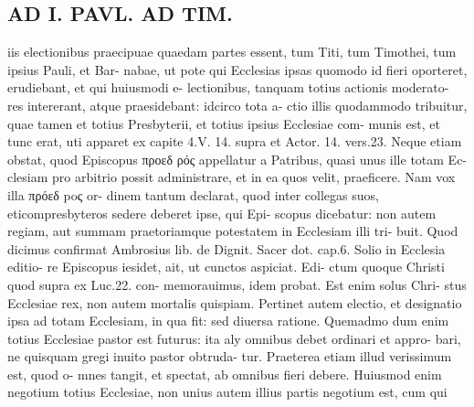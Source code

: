 \documentclass{article}
\begin{document}
\begin{pages}
\section*{AD I. PAVL. AD TIM. }
\marginpar{[ p.043 ]}iis electionibus praecipuae quaedam partes essent, tum Titi, tum Timothei, tum ipsius Pauli, et Bar- nabae, ut pote qui Ecclesias ipsas quomodo id fieri oporteret, erudiebant, et qui huiusmodi e- lectionibus, tanquam totius actionis moderato- res intererant, atque praesidebant: idcirco tota a- ctio illis quodammodo tribuitur, quae tamen et totius Presbyterii, et totius ipsius Ecclesiae com- munis est, et tunc erat, uti apparet ex capite 4.V. 14. supra et Actor. 14. vers.23. Neque etiam obstat, quod Episcopus προεδ ρός appellatur a Patribus, quasi unus ille totam Ec- clesiam pro arbitrio possit administrare, et in ea quos velit, praeficere. Nam vox illa πρόεδ poς or- dinem tantum declarat, quod inter collegas suos, eticompresbyteros sedere deberet ipse, qui Epi- scopus dicebatur: non autem regiam, aut summam praetoriamque potestatem in Ecclesiam illi tri- buit. Quod dicimus confirmat Ambrosius lib. de Dignit. Sacer dot. cap.6. Solio in Ecclesia editio- re Episcopus iesidet, ait, ut cunctos aspiciat. Edi- ctum quoque Christi quod supra ex Luc.22. con- memorauimus, idem probat. Est enim solus Chri- stus Ecclesiae rex, non autem mortalis quispiam. Pertinet autem electio, et designatio ipsa ad totam Ecclesiam, in qua fit: sed diuersa ratione. Quemadmo dum enim totius Ecclesiae pastor est futurus: ita aly omnibus debet ordinari et appro- bari, ne quisquam gregi inuito pastor obtruda- tur. Praeterea etiam illud verissimum est, quod o- mnes tangit, et spectat, ab omnibus fieri debere. Huiusmod enim negotium totius Ecclesiae, non unius autem illius partis negotium est, cum qui 

\end{pages}
\end{document}
